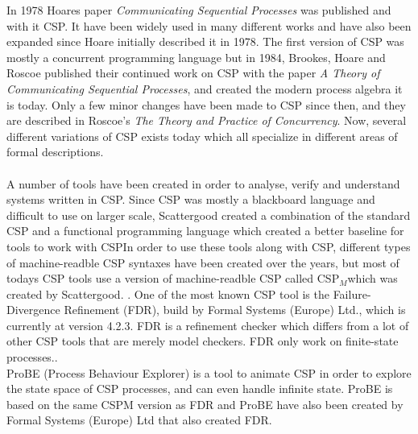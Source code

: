 \documentclass[a4paper]{report}
\newcommand{\cspm}{CSP$_M$}
\begin{document}
In 1978 Hoares paper \textit{Communicating Sequential Processes} was published and with it CSP. It have been widely used in many different works and have also been expanded since Hoare initially described it in 1978. The first version of CSP was mostly a concurrent programming language  but in 1984, Brookes, Hoare and Roscoe published their continued work on CSP with the paper \textit{A Theory of Communicating Sequential Processes}\cite{Brookes1984}, and created the modern process algebra it is today. Only a few minor changes have been made to CSP since then, and they are described in Roscoe's \textit{The Theory and Practice of Concurrency}\cite{Roscoe1997}. Now, several different variations of CSP exists today which all specialize in different areas of formal descriptions.\\\\

A number of tools have been created in order to analyse, verify and understand systems written in CSP. Since CSP was mostly a blackboard language and difficult to use on larger scale, Scattergood created a combination of the standard CSP and a functional programming language which created a better baseline for tools to work with CSPIn order to use these tools along with CSP, different types of machine-readble CSP syntaxes have been created over the years, but most of todays CSP tools use a version of machine-readble CSP called \cspm which was created by Scattergood\cite{Scattergood1998}. . One of the most known CSP tool is the Failure-Divergence Refinement (FDR), build by Formal Systems (Europe) Ltd., which is currently at version 4.2.3\cite{fdr}. FDR is a refinement checker which differs from a lot of other CSP tools that are merely model checkers. FDR only work on finite-state processes..\\ 

ProBE (Process Behaviour Explorer)\cite{probe}  is a tool to animate CSP in order to explore the state space of CSP processes, and can even handle infinite state. ProBE is based on the same CSPM version as FDR and ProBE have also been created by Formal Systems (Europe) Ltd that also created FDR. 
\end{document}
